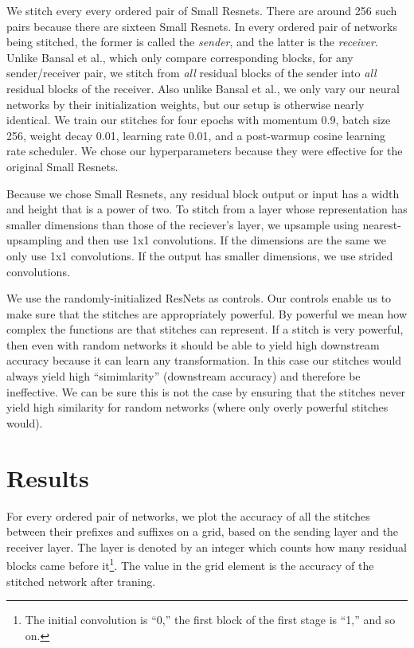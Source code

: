 \documentclass{article} %
\begin{document}
We stitch every every ordered pair of Small Resnets. There are around 256 such pairs because there
are sixteen Small Resnets. In every ordered pair of networks being stitched, the former is called the \textit{sender}, and the latter
is the \textit{receiver}. Unlike Bansal et al., which only compare corresponding blocks,
for any sender/receiver pair, we stitch from \textit{all} residual blocks of the sender into
\textit{all} residual blocks of the receiver. Also unlike Bansal et al., we only vary our neural networks by their
initialization weights, but our setup is otherwise nearly identical. We train our stitches for four epochs with momentum 0.9,
batch size 256, weight decay 0.01, learning rate 0.01, and a post-warmup cosine learning rate scheduler. We chose our
hyperparameters because they were effective for the original Small Resnets.

Because we chose Small Resnets, any residual block output or input has a width and height that is a power of two.
To stitch from a layer whose representation has smaller dimensions
than those of the reciever's layer, we upsample using nearest-upsampling and then use 1x1 convolutions. If the
dimensions are the same we only use 1x1 convolutions. If the output has smaller dimensions, we use strided
convolutions.

We use the randomly-initialized ResNets as controls. Our controls enable us to make sure that
the stitches are appropriately powerful. By powerful we mean how complex the functions are that
stitches can represent. If a stitch is very powerful, then even with random networks it should be able to
yield high downstream accuracy because it can learn any transformation. In this case our stitches would always yield
high ``simimlarity'' (downstream accuracy) and therefore be ineffective.
We can be sure this is not the case by ensuring that
the stitches never yield high similarity for random networks (where only overly powerful stitches
would).

\section{Results}
\label{Results}
For every ordered pair of networks, we plot the accuracy of all the stitches between their prefixes and suffixes
on a grid, based on the sending layer and the receiver layer. The layer is
denoted by an integer which counts how many residual blocks came before it\footnote{
   The initial convolution is ``0,'' the first block of the first stage is ``1,'' and so on.
}. The value in the grid element is the accuracy of the stitched network after traning.
\end{document}
